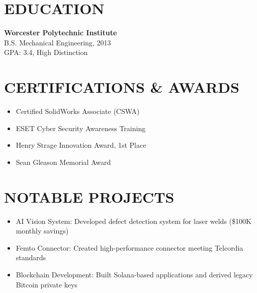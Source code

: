 \documentclass[11pt,letterpaper]{article}
\begin{document}
\section*{EDUCATION}
\textbf{Worcester Polytechnic Institute}\\
B.S. Mechanical Engineering, 2013\\
GPA: 3.4, High Distinction

\section*{CERTIFICATIONS \& AWARDS}
\begin{itemize}[leftmargin=*]
\item Certified SolidWorks Associate (CSWA)
\item ESET Cyber Security Awareness Training
\item Henry Strage Innovation Award, 1st Place
\item Sean Gleason Memorial Award
\end{itemize}

\section*{NOTABLE PROJECTS}
\begin{itemize}[leftmargin=*]
\item AI Vision System: Developed defect detection system for laser welds (\$100K monthly savings)
\item Femto Connector: Created high-performance connector meeting Telcordia standards
\item Blockchain Development: Built Solana-based applications and derived legacy Bitcoin private keys
\end{itemize}
\end{document}
